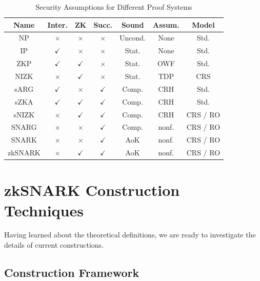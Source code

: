\documentclass[acmtog]{acmart}
\begin{document}
\begin{table}[tb]
	\caption{Security Assumptions for Different Proof Systems}
	\label{tab:security.assumption}
	\centering

	\begin{tabular}{ccccccc}
	\hline

	\hline
	\textbf{Name} & \textbf{Inter.} & \textbf{ZK} & \textbf{Succ.} & \textbf{Sound} & \textbf{Assum.} & \textbf{Model} \\
	\hline
		NP          & $\times$     & $\times$     & $\times$     & Uncond. & None       & Std. \\
		IP          & $\checkmark$ & $\times$     & $\times$     & Stat.   & None       & Std. \\
		ZKP         & $\checkmark$ & $\checkmark$ & $\times$     & Stat.   & OWF        & Std. \\
		NIZK        & $\times$     & $\checkmark$ & $\times$     & Stat.   & TDP        & CRS \\
		sARG        & $\checkmark$ & $\times$     & $\checkmark$ & Comp.   & CRH        & Std. \\
		sZKA        & $\checkmark$ & $\checkmark$ & $\checkmark$ & Comp.   & CRH        & Std.\\
		sNIZK       & $\times$     & $\checkmark$ & $\checkmark$ & Comp.   & CRH        & CRS / RO \\
		SNARG       & $\times$     & $\times$     & $\checkmark$ & Comp.   & nonf.      & CRS / RO  \\
		SNARK       & $\times$     & $\times$     & $\checkmark$ & AoK     & nonf.      & CRS / RO \\
		zkSNARK     & $\times$     & $\checkmark$ & $\checkmark$ & AoK     & nonf.      & CRS / RO  \\
	\hline

	\hline
	\end{tabular}
\end{table}

\section{zkSNARK Construction Techniques}

Having learned about the theoretical definitions, we are ready to investigate the details of current constructions.

\subsection{Construction Framework}
\end{document}
